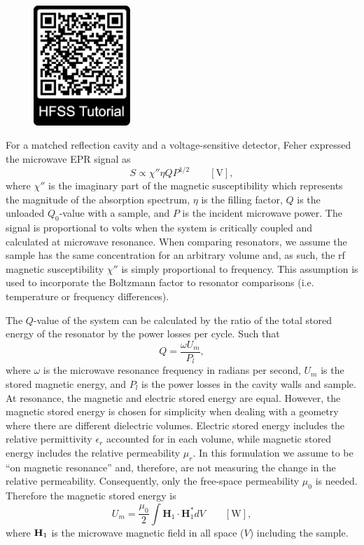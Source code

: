 \begin{figure}
\centering
\includegraphics[width=3.65cm]{Kapitel/Appendix/HFSSTutQR.eps}
\end{figure}

For a matched reflection cavity and a voltage-sensitive detector, Feher expressed the microwave EPR signal as
\begin{equation}
    S \propto \chi'' \eta Q P^{1/2} \qquad [\text{V}],\label{ch2-fehereq}
\end{equation}
where $\chi''$ is the imaginary part of the magnetic susceptibility which represents the magnitude of the absorption spectrum, $\eta$ is the filling factor, $Q$ is the unloaded $Q_0$-value with a sample, and $P$ is the incident microwave power.  \cite{FeherSignal} The signal is proportional to volts when the system is critically coupled and calculated at microwave resonance. When comparing resonators, we assume the sample has the same concentration for an arbitrary volume and, as such, the rf magnetic susceptibility $\chi''$ is simply proportional to frequency. This assumption is used to incorporate the Boltzmann factor to resonator comparisons (i.e. temperature or frequency differences).

The $Q$-value of the system can be calculated by the ratio of the total stored energy of the resonator by the power losses per cycle. Such that
\begin{equation}
    Q = \frac{\omega U_m}{P_l},\label{ch2-Qval}
\end{equation}
where $\omega$ is the microwave resonance frequency in radians per second, $U_m$ is the stored magnetic energy, and $P_l$ is the power losses in the cavity walls and sample. At resonance, the magnetic and electric stored energy are equal. \cite{ramo1984fields} However, the magnetic stored energy is chosen for simplicity when dealing with a geometry where there are different dielectric volumes. Electric stored energy includes the relative permittivity $\epsilon_r$ accounted for in each volume, while magnetic stored energy includes the relative permeability $\mu_r$. In this formulation we assume to be ``on magnetic resonance'' and, therefore, are not measuring the change in the relative permeability. Consequently, only the free-space permeability $\mu_0$ is needed. Therefore the magnetic stored energy is
\begin{equation}
    U_m = \frac{\mu_0}{2} \int \mathbf{H}_1\cdot\mathbf{H}_1^* dV \qquad [\text{W}],
\end{equation}
where ${\textbf H}_1$ is the microwave magnetic field in all space ($V$) including the sample.


